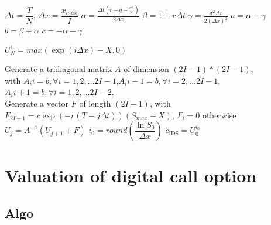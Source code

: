 \begin{algorithm}[H]
	$\Delta t = \dfrac{T}{N}$, 
	$\Delta x = \dfrac{x_{max}}{I}$\;
	$\alpha = \frac{\Delta t(r - q - \frac{\sigma^{2}}{2})}{2\Delta x}$\;
	$\beta = 1+ r \Delta t$\;
	$\gamma = \frac{\sigma^{2}\Delta t}{2(\Delta x)^{2}}$\;
	$a = \alpha - \gamma$\;
	$b = \beta + \alpha$\;
	$c = -\alpha - \gamma$\;
	
	 {
		$U_{N}^{i} = max(\exp(i\Delta x) - X, 0)$\;
	}
	
	Generate a tridiagonal matrix $A$ of dimension $(2I-1) * (2I-1)$, \\
	with $A_{i}{i} = b, \forall i = 1, 2, \dots 2I-1$,$A_{i}{i-1} = b, \forall i = 2, \dots 2I-1$, $A_{i}{i+1} = b, \forall i = 1, 2, \dots 2I-2$.\\
	
	 {
		Generate a vector $F$ of length $(2I-1)$, with $F_{2I-1} = c\exp(-r(T-j \Delta t))(S_{max} - X)$, $F_{i} = 0$ otherwise\;
		$U_{j} = A^{-1} (U_{j+1} + F)$\;
	}
	$i_0 = round \left (\dfrac{\ln{S_0}}{\Delta x} \right )$\;
	$c_{\text{IDS}} = U_0^{i_0}$\;
	
\end{algorithm}


\section{Valuation of digital call option}

\subsection{Algo}



